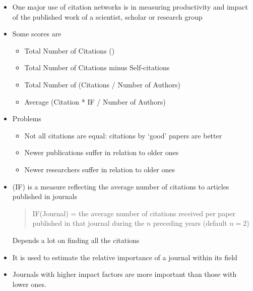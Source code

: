 \documentclass[a4paper,landscape,headrule,footrule,xetex]{foils}
\begin{document}
\begin{itemize}
\item One major use of citation networks is in measuring productivity
  and impact of the published work of a scientist, scholar or research
  group
\item Some scores are
  \begin{itemize}
  \item Total Number of Citations \hfill ()
  \item Total Number of Citations minus Self-citations
  \item Total Number of (Citations / Number of Authors)
  \item Average (Citation * IF / Number of Authors)
  \end{itemize}
\item Problems
  \begin{itemize}
  \item Not all citations are equal: citations by `good' papers are better
  \item Newer publications suffer in relation to older ones
  \item Newer researchers suffer in relation to older ones
  \end{itemize}
\end{itemize}



\begin{itemize}
\item (IF) is a measure reflecting the average number of citations to
  articles published in journals
  \begin{quote}
IF(Journal) = the average number of citations received per paper published in that journal during the $n$ preceding years (default $n = 2$)
  \end{quote}
  Depends a lot on finding all the citations

\item It is used to estimate the relative importance of a journal within its field
\item Journals with higher impact factors are more important than those with lower ones.
\end{itemize}

\end{document}
